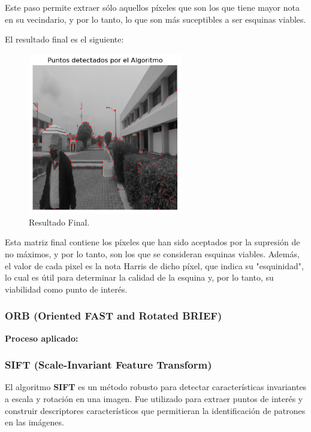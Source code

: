 \documentclass[a4paper]{article}
\begin{document}
Este paso permite extraer sólo aquellos píxeles que son los que tiene mayor nota en su vecindario, y por lo tanto, lo que son más suceptibles a ser esquinas viables.

El resultado final es el siguiente:
\par\vspace{0.5cm}

\begin{figure}[H]
    \centering
    \includegraphics[width=0.6\textwidth]{images/harris_paso_8.png}
    \caption{Resultado Final.}
\end{figure}

Esta matriz final contiene los píxeles que han sido aceptados por la supresión de no máximos, y por lo tanto, son los que se consideran esquinas viables. Además, el valor de cada pixel es la nota Harris de dicho píxel, que indica su "esquinidad", lo
cual es útil para determinar la calidad de la esquina y, por lo tanto, su viabilidad como punto de interés.

\subsubsection{ORB (Oriented FAST and Rotated BRIEF)}

\textbf{Proceso aplicado:}

\subsubsection{SIFT (Scale-Invariant Feature Transform)}

El algoritmo \textbf{SIFT} es un método robusto para detectar características invariantes a escala y rotación en una imagen. Fue utilizado para extraer puntos de interés y construir descriptores característicos que permitieran la identificación de patrones en las imágenes.
\end{document}
